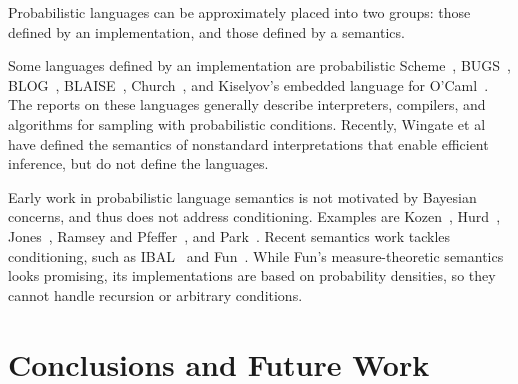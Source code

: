 \documentclass{llncs}
\begin{document}
Probabilistic languages can be approximately placed into two groups: those defined by an implementation, and those defined by a semantics.

Some languages defined by an implementation are probabilistic Scheme~\cite{cit:koller-1997aaai-bayes-programs-short}, BUGS~\cite{cit:winbugs-language-short}, BLOG~\cite{cit:blog-language-short}, BLAISE~\cite{cit:blaise-language}, Church~\cite{cit:church-language-short}, and Kiselyov's embedded language for O'Caml~\cite{cit:kiselyov-2008uai-monolingual}.
The reports on these languages generally describe interpreters, compilers, and algorithms for sampling with probabilistic conditions.
Recently, Wingate et al~\cite{cit:wingate-2011nips-nonstandard} have defined the semantics of nonstandard interpretations that enable efficient inference, but do not define the languages.

Early work in probabilistic language semantics is not motivated by Bayesian concerns, and thus does not address conditioning.
Examples are Kozen~\cite{cit:kozen-1979fcs-prob-programs-short}, Hurd~\cite{cit:hurd-2002thesis}, Jones~\cite{cit:jones-1990thesis}, Ramsey and Pfeffer~\cite{cit:ramsey-2002popl-stochastic-short}, and Park~\cite{cit:park-2008toplas-prob}.
Recent semantics work tackles conditioning, such as IBAL~\cite{cit:pfeffer-2007chapter-ibal} and Fun~\cite{cit:borgstrom-2011esop-measure-transformer}.
While Fun's measure-theoretic semantics looks promising, its implementations are based on probability densities, so they cannot handle recursion or arbitrary conditions.


\section{Conclusions and Future Work}
\end{document}
